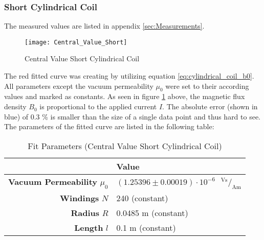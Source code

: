 \subsubsection{Short Cylindrical Coil}
\label{subsubsec:Short_Cylindrical_Coil}
The measured values are listed in appendix \ref{sec:Measurements}.
\begin{figure}[H]
	\centering
	\texttt{[image: Central\_Value\_Short]}
	\caption{Central Value Short Cylindrical Coil}
	\label{fig:Central_Value_Short}
\end{figure}
The red fitted curve was creating by utilizing equation \ref{eq:cylindrical_coil_b0}. All parameters except the vacuum permeability $\mu_0$ were set to their according values and marked as constants. As seen in figure \ref{fig:Central_Value_Short} above, the magnetic flux density $B_0$ is proportional to the applied current $I$. The absolute error (shown in blue) of 0.3 \% is smaller than the size of a single data point and thus hard to see. The parameters of the fitted curve are listed in the following table:
\begin{table}[H]
	\centering
	\renewcommand{\arraystretch}{1.3}
	\begin{tabular}{r|l}
		& \textbf{Value} \\
		\hline\hline
		\textbf{Vacuum Permeability} $\mu_0$ & $(1.25396\pm0.00019)\cdot10^{-6}$\ $\,^\text{Vs}\!/_\text{Am}$ \\
		\textbf{Windings} $N$ & 240 (constant) \\
		\textbf{Radius} $R$ & 0.0485 m (constant) \\
		\textbf{Length} $l$ & 0.1 m (constant) \\
	\end{tabular}
	\caption{Fit Parameters (Central Value Short Cylindrical Coil)}
	\label{tab:Central_Value_Short}
\end{table}
